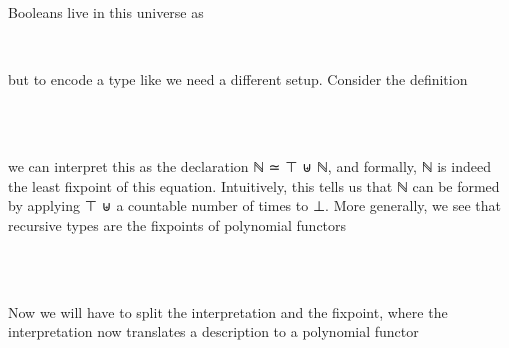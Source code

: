 Booleans live in this universe as
\begin{code}%
%
\>[2]\AgdaSpace{}%
\AgdaSymbol{:}\AgdaSpace{}%
\<%
\\
%
\>[2]\AgdaSpace{}%
\AgdaSymbol{=}\AgdaSpace{}%
\AgdaSpace{}%
\AgdaSpace{}%
\<%
\end{code}
but to encode a type like \bN we need a different setup. Consider the definition
\begin{code}%
\>[0]\AgdaSpace{}%
\AgdaSpace{}%
\AgdaSymbol{:}\AgdaSpace{}%
\AgdaSpace{}%
\<%
\\
\>[0][@{}l@{\AgdaIndent{0}}]%
\>[2]%
\>[8]\AgdaSymbol{:}\AgdaSpace{}%
\<%
\\
%
\>[2]%
\>[8]\AgdaSymbol{:}\AgdaSpace{}%
\AgdaSpace{}%
\AgdaSpace{}%
\<%
\end{code}
we can interpret this as the declaration ℕ ≃ ⊤ ⊎ ℕ, and formally, ℕ is indeed the least fixpoint of this equation. Intuitively, this tells us that ℕ can be formed by applying ⊤ ⊎ a countable number of times to ⊥. More generally, we see that recursive types are the fixpoints of polynomial functors
\begin{code}[hide]%
\>[0]\AgdaSpace{}%
\AgdaSpace{}%
\<%
\end{code}
\begin{code}%
\>[0][@{}l@{\AgdaIndent{1}}]%
\>[2]\AgdaSpace{}%
\AgdaSpace{}%
\AgdaSymbol{:}\AgdaSpace{}%
\AgdaSpace{}%
\<%
\\
\>[2][@{}l@{\AgdaIndent{0}}]%
\>[4]\AgdaSpace{}%
%
\>[13]\AgdaSymbol{:}\AgdaSpace{}%
\<%
\\
%
\>[4]\AgdaSpace{}%
%
\>[13]\AgdaSymbol{:}\AgdaSpace{}%
\AgdaSpace{}%
\AgdaSpace{}%
\AgdaSpace{}%
\AgdaSpace{}%
\<%
\end{code}
Now we will have to split the interpretation and the fixpoint, where the interpretation now translates a description to a polynomial functor
